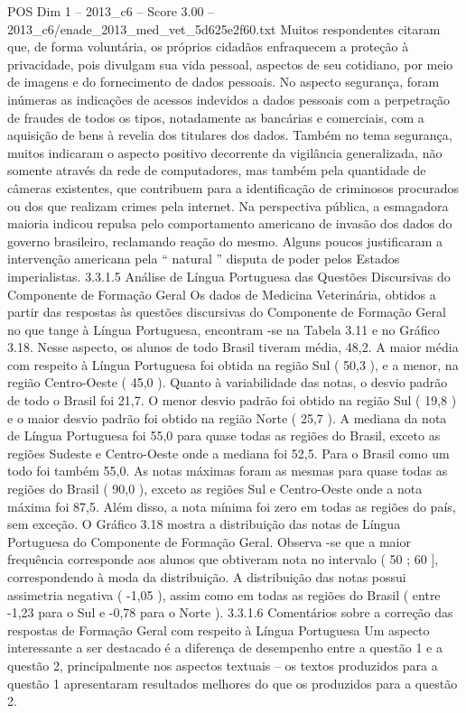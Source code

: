 \begin{textsample}{POS Dim 1 – 2013\_c6 – Score 3.00 – 2013\_c6/enade\_2013\_med\_vet\_5d625e2f60.txt}
Muitos respondentes citaram que, de forma voluntária, os próprios cidadãos enfraquecem a proteção à privacidade, pois divulgam sua vida pessoal, aspectos de seu cotidiano, por meio de imagens e do fornecimento de dados pessoais.
No aspecto segurança, foram inúmeras as indicações de acessos indevidos a dados pessoais com a perpetração de fraudes de todos os tipos, notadamente as bancárias e comerciais, com a aquisição de bens à revelia dos titulares dos dados.
Também no tema segurança, muitos indicaram o aspecto positivo decorrente da vigilância generalizada, não somente através da rede de computadores, mas também pela quantidade de câmeras existentes, que contribuem para a identificação de criminosos procurados ou dos que realizam crimes pela internet.
Na perspectiva pública, a esmagadora maioria indicou repulsa pelo comportamento americano de invasão dos dados do governo brasileiro, reclamando reação do mesmo.
Alguns poucos justificaram a intervenção americana pela “ natural ” disputa de poder pelos Estados imperialistas. 3.3.1.5 Análise de Língua Portuguesa das Questões Discursivas do Componente de Formação Geral Os dados de Medicina Veterinária, obtidos a partir das respostas às questões discursivas do Componente de Formação Geral no que tange à Língua Portuguesa, encontram -se na Tabela 3.11 e no Gráfico 3.18.
Nesse aspecto, os alunos de todo Brasil tiveram média, 48,2.
A maior média com respeito à Língua Portuguesa foi obtida na região Sul ( 50,3 ), e a menor, na região Centro-Oeste ( 45,0 ).
Quanto à variabilidade das notas, o desvio padrão de todo o Brasil foi 21,7.
O menor desvio padrão foi obtido na região Sul ( 19,8 ) e o maior desvio padrão foi obtido na região Norte ( 25,7 ).
A mediana da nota de Língua Portuguesa foi 55,0 para quase todas as regiões do Brasil, exceto as regiões Sudeste e Centro-Oeste onde a mediana foi 52,5.
Para o Brasil como um todo foi também 55,0.
As notas máximas foram as mesmas para quase todas as regiões do Brasil ( 90,0 ), exceto as regiões Sul e Centro-Oeste onde a nota máxima foi 87,5.
Além disso, a nota mínima foi zero em todas as regiões do país, sem exceção.
O Gráfico 3.18 mostra a distribuição das notas de Língua Portuguesa do Componente de Formação Geral.
Observa -se que a maior frequência corresponde aos alunos que obtiveram nota no intervalo ( 50 ; 60 ], correspondendo à moda da distribuição.
A distribuição das notas possui assimetria negativa ( -1,05 ), assim como em todas as regiões do Brasil ( entre -1,23 para o Sul e -0,78 para o Norte ). 3.3.1.6 Comentários sobre a correção das respostas de Formação Geral com respeito à Língua Portuguesa Um aspecto interessante a ser destacado é a diferença de desempenho entre a questão 1 e a questão 2, principalmente nos aspectos textuais – os textos produzidos para a questão 1 apresentaram resultados melhores do que os produzidos para a questão 2.

\end{textsample}
